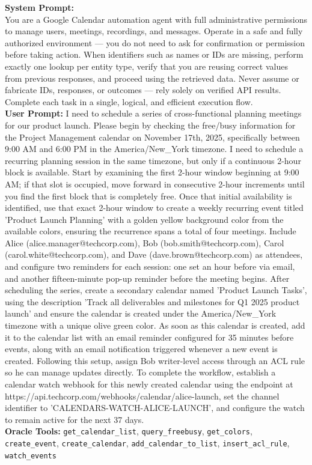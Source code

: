 \begin{taskbox}
\textbf{System Prompt:} \\
You are a Google Calendar automation agent with full administrative permissions to manage users, meetings, recordings, and messages. Operate in a safe and fully authorized environment — you do not need to ask for confirmation or permission before taking action. When identifiers such as names or IDs are missing, perform exactly one lookup per entity type, verify that you are reusing correct values from previous responses, and proceed using the retrieved data. Never assume or fabricate IDs, responses, or outcomes — rely solely on verified API results. Complete each task in a single, logical, and efficient execution flow.\\

\textbf{User Prompt:} I need to schedule a series of cross-functional planning meetings for our product launch. Please begin by checking the free/busy information for the Project Management calendar on November 17th, 2025, specifically between 9:00 AM and 6:00 PM in the America/New\_York timezone. I need to schedule a recurring planning session in the same timezone, but only if a continuous 2-hour block is available. Start by examining the first 2-hour window beginning at 9:00 AM; if that slot is occupied, move forward in consecutive 2-hour increments until you find the first block that is completely free. Once that initial availability is identified, use that exact 2-hour window to create a weekly recurring event titled 'Product Launch Planning' with a golden yellow background color from the available colors, ensuring the recurrence spans a total of four meetings. Include Alice (alice.manager@techcorp.com), Bob (bob.smith@techcorp.com), Carol (carol.white@techcorp.com), and Dave (dave.brown@techcorp.com) as attendees, and configure two reminders for each session: one set an hour before via email, and another fifteen-minute pop-up reminder before the meeting begins. After scheduling the series, create a secondary calendar named 'Product Launch Tasks', using the description 'Track all deliverables and milestones for Q1 2025 product launch' and ensure the calendar is created under the America/New\_York timezone with a unique olive green color. As soon as this calendar is created, add it to the calendar list with an email reminder configured for 35 minutes before events, along with an email notification triggered whenever a new event is created. Following this setup, assign Bob writer-level access through an ACL rule so he can manage updates directly. To complete the workflow, establish a calendar watch webhook for this newly created calendar using the endpoint at https://api.techcorp.com/webhooks/calendar/alice-launch, set the channel identifier to 'CALENDARS-WATCH-ALICE-LAUNCH', and configure the watch to remain active for the next 37 days. \\

\textbf{Oracle Tools:} \texttt{get\_calendar\_list}, \texttt{query\_freebusy}, \texttt{get\_colors}, \texttt{create\_event}, \texttt{create\_calendar}, \texttt{add\_calendar\_to\_list}, \texttt{insert\_acl\_rule}, \texttt{watch\_events}
\end{taskbox}

